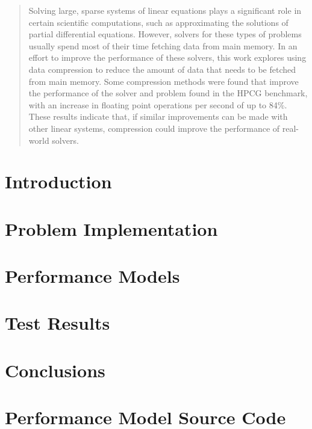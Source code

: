 \documentclass[]{csbsjuthesis}
\title{}
\author{Neil Lindquist}
\date{April 2019}
\begin{document}
\theoremstyle{definition}
\newtheorem{example}{Example}

\maketitle

\sigpage

\begin{abstract}
	Solving large, sparse systems of linear equations plays a significant role in certain scientific computations, such as approximating the solutions of partial differential equations.
	However, solvers for these types of problems usually spend most of their time fetching data from main memory.
	In an effort to improve the performance of these solvers, this work explores using data compression to reduce the amount of data that needs to be fetched from main memory.
	Some compression methods were found that improve the performance of the solver and problem found in the HPCG benchmark, with an increase in floating point operations per second of up to 84\%.
	These results indicate that, if similar improvements can be made with other linear systems, compression could improve the performance of real-world solvers.
\end{abstract}

\tableofcontents
\clearpage

\listofalgorithms
\listoffigures
\listoftables
\clearpage

\mainmatter

\section{Introduction}


\section{Problem Implementation}
\label{sec:bg}


\section{Performance Models}


\section{Test Results}
\label{sec:results}


\section{Conclusions}




\appendix

\section{Performance Model Source Code}
\label{app:decode-model-source}

 
\end{document}
